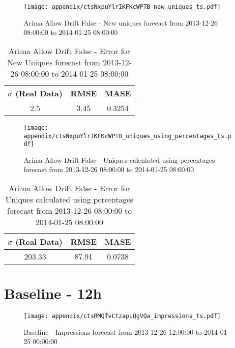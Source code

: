 \begin{figure}[H] \begin{center} \leavevmode
\texttt{[image: appendix/ctsNxpuYlrIKFKcWPTB\_new\_uniques\_ts.pdf]} \caption[]{
Arima Allow Drift False - New uniques forecast from 2013-12-26 08:00:00 to 2014-01-25 08:00:00} \label{fig:appendix/ctsNxpuYlrIKFKcWPTB_new_uniques_ts.pdf} \end{center}
\end{figure}

\begin{table}[H]
\centering
\footnotesize
\begin{tabular}{ccc}
$\sigma$ (Real Data) & RMSE & MASE   \\ \hline
2.5 & 3.45 & 0.3254 \\
\end{tabular}

\vspace{0.5cm}

\caption[]{
Arima Allow Drift False - Error for New Uniques forecast from 2013-12-26 08:00:00 to 2014-01-25 08:00:00}
\end{table}

\begin{figure}[H] \begin{center} \leavevmode
\texttt{[image: appendix/ctsNxpuYlrIKFKcWPTB\_uniques\_using\_percentages\_ts.pdf]} \caption[]{
Arima Allow Drift False - Uniques calculated using percentages forecast from 2013-12-26 08:00:00 to 2014-01-25 08:00:00} \label{fig:appendix/ctsNxpuYlrIKFKcWPTB_uniques_using_percentages_ts.pdf} \end{center}
\end{figure}

\begin{table}[H]
\centering
\footnotesize
\begin{tabular}{ccc}
$\sigma$ (Real Data) & RMSE & MASE   \\ \hline
203.33 & 87.91 & 0.0738 \\
\end{tabular}

\vspace{0.5cm}

\caption[]{
Arima Allow Drift False - Error for Uniques calculated using percentages forecast from 2013-12-26 08:00:00 to 2014-01-25 08:00:00}
\end{table}

\section{Baseline - 12h}
\begin{figure}[H] \begin{center} \leavevmode
\texttt{[image: appendix/ctsRMQfvCtzapLQgVQa\_impressions\_ts.pdf]} \caption[]{
Baseline - Impressions forecast from 2013-12-26 12:00:00 to 2014-01-25 00:00:00} \label{fig:appendix/ctsRMQfvCtzapLQgVQa_impressions_ts.pdf} \end{center}
\end{figure}


